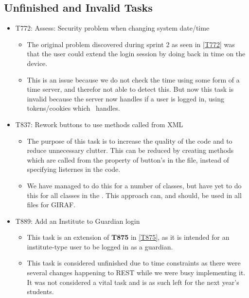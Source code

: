\subsection{Unfinished and Invalid Tasks}\label{S4Invalid}
\begin{itemize}
  \item T772: Assess: Security problem when changing system date/time
      \begin{itemize}
          \item The original problem discovered during sprint 2 as seen in \autoref{T772}
         was that the user could extend the login session by doing back in time on the
          device.
        \item This is an issue because we do not check the time using some form of a
        time server, and therefor not able to detect this.  
        But now this task is invalid because the server now handles if a user is
        logged in, using tokens/cookies which \rlib\ handles.
        \end{itemize}
  \item T837: Rework buttons to use methods called from XML
    \begin{itemize}
      \item The purpose of this task is to increase the quality of the code and to
      reduce unnecessary clutter. This can be reduced by creating methods which
      are called from the  property of button's in the 
      file, instead of specifying listernes in the code. 
      \item We have managed to
      do this for a number of classes, but have yet to do this for all classes
      in the \lapp. This approach can, and should, be used in all 
      files for GIRAF.
      \end{itemize}
  \item T889: Add an Institute to Guardian login \label{T889}
   \begin{itemize}
     \item This task is an extension of \textbf{T875} in \autoref{T875}, as it
     is intended for an institute-type user to be logged in as a guardian. 
     \item This task is considered unfinished due to time constraints as there
     were several changes happening to REST while we were busy implementing it.
     It was not considered a vital task and is as such left for the next year's
     students.
   \end{itemize}
\end{itemize}

